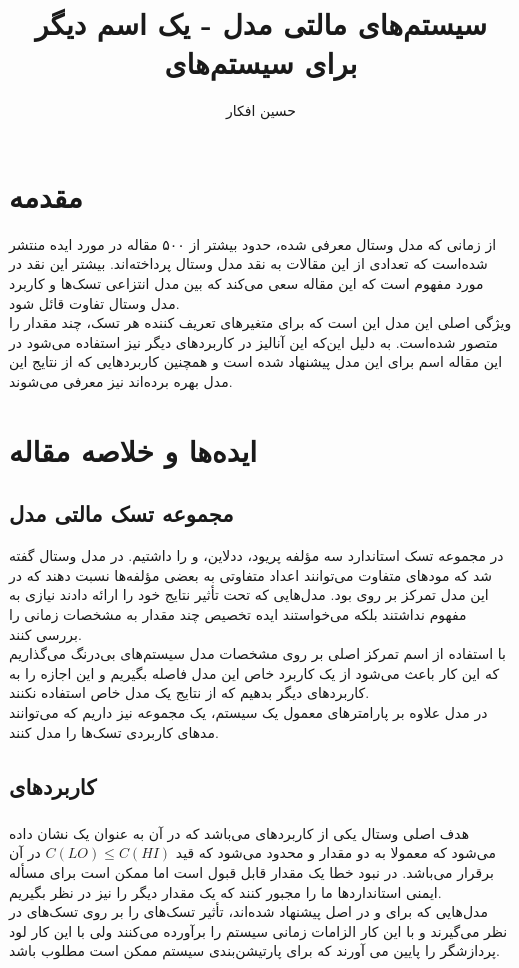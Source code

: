 \documentclass[a4paper, 11pt]{article}
\title{سیستم‌های مالتی مدل - یک اسم دیگر برای سیستم‌های \lr{MCS}}
\author{حسین افکار}
\begin{document}
\maketitle

\section{مقدمه}
از زمانی که مدل وستال معرفی شده، حدود بیشتر از ۵۰۰ مقاله در مورد ایده
منتشر شده‌است که تعدادی از این مقالات به نقد مدل وستال پرداخته‌اند. بیشتر این نقد در مورد مفهوم
است که این مقاله سعی می‌کند که بین مدل انتزاعی تسک‌ها و کاربرد مدل وستال تفاوت قائل شود. \\
ویژگی اصلی این مدل این است که برای متغیر‌های تعریف کننده هر تسک، چند مقدار
را متصور شده‌است. به دلیل این‌که این آنالیز در کاربرد‌های دیگر نیز استفاده می‌شود در این مقاله اسم
برای این مدل پیشنهاد شده است و همچنین کاربرد‌هایی که از نتایج این مدل بهره برده‌اند نیز معرفی
می‌شوند.

\section{ایده‌ها و خلاصه مقاله}
\subsection{مجموعه تسک مالتی مدل}
در مجموعه تسک استاندارد سه مؤلفه پریود، ددلاین، و
را داشتیم. در مدل وستال گفته شد که مود‌های متفاوت می‌توانند اعداد متفاوتی به بعضی مؤلفه‌ها
نسبت دهند که در این مدل تمرکز بر روی
بود. مدل‌هایی که تحت تأثیر
نتایج خود را ارائه دادند نیازی به مفهوم
نداشتند بلکه می‌خواستند ایده تخصیص چند مقدار به مشخصات زمانی را بررسی کنند. \\
با استفاده از اسم
تمرکز اصلی بر روی مشخصات مدل سیستم‌های بی‌درنگ می‌گذاریم که این کار باعث می‌شود از یک
کاربرد خاص این مدل فاصله بگیریم و این اجازه را به کاربرد‌های دیگر بدهیم که از نتایج یک مدل
خاص استفاده نکنند. \\
در مدل
علاوه بر پارامتر‌های معمول یک سیستم، یک مجموعه
نیز داریم که می‌توانند مد‌‌های کاربردی تسک‌ها را مدل کنند.
\subsection{کاربرد‌های }
\subsubsection{}
هدف اصلی وستال یکی از کاربرد‌های
می‌باشد که در آن
به عنوان یک
نشان داده می‌شود که معمولا به دو مقدار
و
محدود می‌شود که قید
$C(LO) \le C(HI)$
در آن برقرار می‌باشد. در نبود خطا
یک مقدار قابل قبول است اما ممکن است برای مسأله ایمنی استاندارد‌ها ما را مجبور کنند که یک مقدار
دیگر را نیز در نظر بگیریم. \\
مدل‌هایی که برای
و در اصل
پیشنهاد شده‌اند، تأثیر تسک‌های
را بر روی تسک‌های
در نظر می‌گیرند و با این کار الزامات زمانی سیستم را برآورده می‌کنند ولی با این کار لود پردازشگر را پایین
می آورند که برای پارتیشن‌بندی سیستم ممکن است مطلوب باشد.
\end{document}
